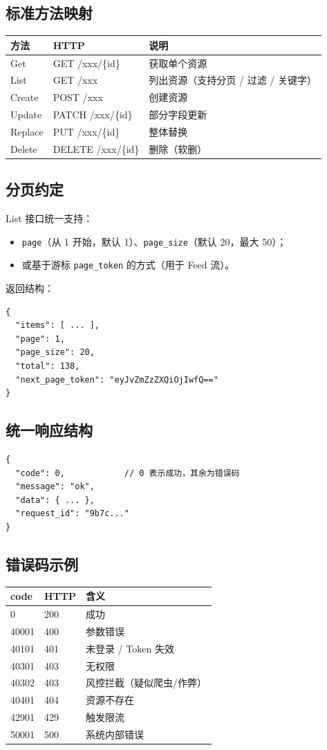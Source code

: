 \documentclass[11pt,a4paper]{ctexart}
\begin{document}
\subsection{标准方法映射}
\begin{tabularx}{\textwidth}{p{2cm}p{3cm}X}
\toprule
方法 & HTTP & 说明\\
\midrule
Get      & GET    /xxx/\{id\}    & 获取单个资源\\
List     & GET    /xxx          & 列出资源（支持分页 / 过滤 / 关键字）\\
Create   & POST   /xxx          & 创建资源\\
Update   & PATCH  /xxx/\{id\}    & 部分字段更新\\
Replace  & PUT    /xxx/\{id\}    & 整体替换\\
Delete   & DELETE /xxx/\{id\}    & 删除（软删）\\
\bottomrule
\end{tabularx}

\subsection{分页约定}
List 接口统一支持：
\begin{itemize}[leftmargin=2em]
    \item \texttt{page}（从 1 开始，默认 1）、\texttt{page\_size}（默认 20，最大 50）；
    \item 或基于游标 \texttt{page\_token} 的方式（用于 Feed 流）。
\end{itemize}
返回结构：
\begin{lstlisting}
{
  "items": [ ... ],
  "page": 1,
  "page_size": 20,
  "total": 138,
  "next_page_token": "eyJvZmZzZXQiOjIwfQ=="
}
\end{lstlisting}

\subsection{统一响应结构}
\begin{lstlisting}
{
  "code": 0,            // 0 表示成功，其余为错误码
  "message": "ok",
  "data": { ... },
  "request_id": "9b7c..."
}
\end{lstlisting}

\subsection{错误码示例}
\begin{tabularx}{\textwidth}{p{2cm}p{3cm}X}
\toprule
code & HTTP & 含义\\
\midrule
0      & 200 & 成功\\
40001  & 400 & 参数错误\\
40101  & 401 & 未登录 / Token 失效\\
40301  & 403 & 无权限\\
40302  & 403 & 风控拦截（疑似爬虫/作弊）\\
40401  & 404 & 资源不存在\\
42901  & 429 & 触发限流\\
50001  & 500 & 系统内部错误\\
\bottomrule
\end{tabularx}
\end{document}
